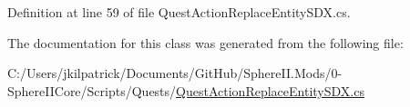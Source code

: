 Definition at line 59 of file Quest\+Action\+Replace\+Entity\+S\+D\+X.\+cs.



The documentation for this class was generated from the following file\+:\begin{DoxyCompactItemize}
\item 
C\+:/\+Users/jkilpatrick/\+Documents/\+Git\+Hub/\+Sphere\+I\+I.\+Mods/0-\/\+Sphere\+I\+I\+Core/\+Scripts/\+Quests/\mbox{\hyperlink{_quest_action_replace_entity_s_d_x_8cs}{Quest\+Action\+Replace\+Entity\+S\+D\+X.\+cs}}\end{DoxyCompactItemize}
